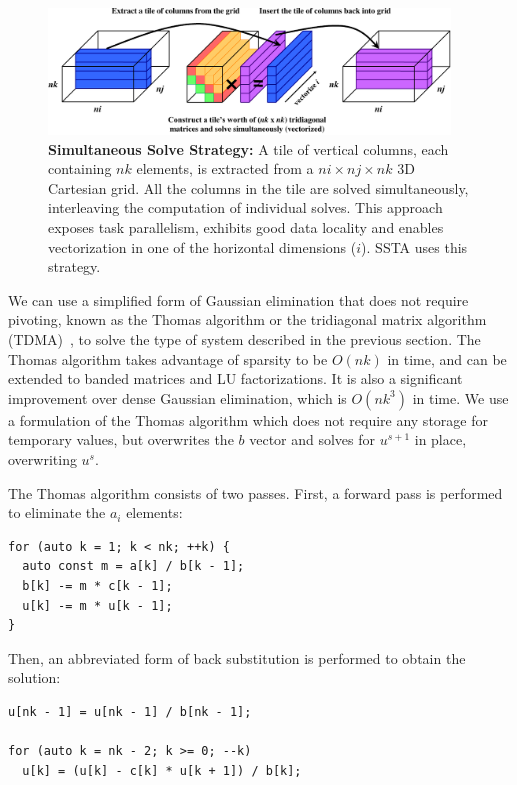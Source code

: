 \documentclass[10pt, conference, compsocconf]{IEEEtran}
\begin{document}
\begin{figure}[!bth]
  \centering
  \caption{\small
    \textbf{Simultaneous Solve Strategy:} A tile of vertical columns, each 
      containing \(nk\) elements, is extracted from a \(ni \times nj \times nk\)
      3D Cartesian grid.
    All the columns in the tile are solved simultaneously, interleaving 
      the computation of individual solves.
    This approach exposes task parallelism, exhibits good data locality and
      enables vectorization in one of the horizontal dimensions (\(i\)).
    SSTA uses this strategy.
  }
  \label{fig:impl:batching:sim_strat}
  \includegraphics[width=0.95\textwidth]{figures/batching/simultaneous_solve_diagram.pdf}
\end{figure}

We can use a simplified form of Gaussian elimination that does not require
  pivoting, known as the Thomas algorithm or the tridiagonal matrix algorithm
  (TDMA)~\cite{elem_numerical_analysis_conte}, to
  solve the type of system described in the previous section.
The Thomas algorithm takes advantage of sparsity to be \(O(nk)\) in time, 
  and can be extended to banded matrices and LU factorizations.
It is also a significant improvement over dense Gaussian elimination,
  which is \(O(nk^3)\) in time. 
We use a formulation of the Thomas algorithm which does not require any storage
  for temporary values, but overwrites the \(b\) vector and solves for
  \(u^{s+1}\) in place, overwriting \(u^{s}\).

The Thomas algorithm consists of two passes.  First, a forward pass is
  performed to eliminate the \(a_i\) elements:
\begin{lstlisting}
for (auto k = 1; k < nk; ++k) {
  auto const m = a[k] / b[k - 1];
  b[k] -= m * c[k - 1];
  u[k] -= m * u[k - 1];
} 
\end{lstlisting}
Then, an abbreviated form of back substitution is performed to obtain the
  solution:
\begin{lstlisting}
u[nk - 1] = u[nk - 1] / b[nk - 1];

for (auto k = nk - 2; k >= 0; --k) 
  u[k] = (u[k] - c[k] * u[k + 1]) / b[k];
\end{lstlisting}
\end{document}
